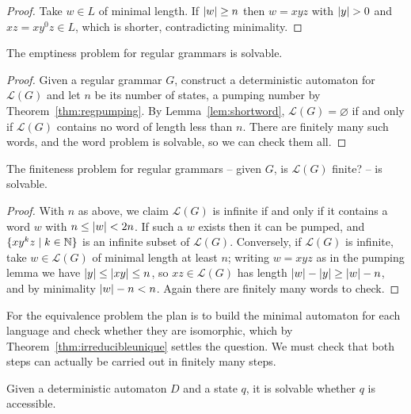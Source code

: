 \documentclass[a4paper]{scrartcl}
\newcommand{\lang}{\mathcal{L}}
\begin{document}
\begin{proof}
	Take $w \in L$ of minimal length. If $\lvert w\rvert \geq n$ then $w = xyz$ with $\lvert y\rvert > 0$ and $xz = xy^0z \in L$, which is shorter, contradicting minimality.
\end{proof}

\begin{corollary}\label{cor:regemptiness}
	The emptiness problem for regular grammars is solvable.
\end{corollary}

\begin{proof}
	Given a regular grammar $G$, construct a deterministic automaton for $\lang(G)$ and let $n$ be its number of states, a pumping number by Theorem~\ref{thm:regpumping}. By Lemma~\ref{lem:shortword}, $\lang(G) = \varnothing$ if and only if $\lang(G)$ contains no word of length less than $n$. There are finitely many such words, and the word problem is solvable, so we can check them all.
\end{proof}

\begin{corollary}
	The finiteness problem for regular grammars -- given $G$, is $\lang(G)$ finite? -- is solvable.
\end{corollary}

\begin{proof}
	With $n$ as above, we claim $\lang(G)$ is infinite if and only if it contains a word $w$ with $n \leq \lvert w\rvert < 2n$. If such a $w$ exists then it can be pumped, and $\{xy^kz \mid k \in \mathbb{N}\}$ is an infinite subset of $\lang(G)$. Conversely, if $\lang(G)$ is infinite, take $w \in \lang(G)$ of minimal length at least $n$; writing $w = xyz$ as in the pumping lemma we have $\lvert y\rvert \leq \lvert xy\rvert \leq n$, so $xz \in \lang(G)$ has length $\lvert w\rvert - \lvert y\rvert \geq \lvert w\rvert - n$, and by minimality $\lvert w\rvert - n < n$. Again there are finitely many words to check.
\end{proof}

For the equivalence problem the plan is to build the minimal automaton for each language and check whether they are isomorphic, which by Theorem~\ref{thm:irreducibleunique} settles the question. We must check that both steps can actually be carried out in finitely many steps.

\begin{proposition}
	Given a deterministic automaton $D$ and a state $q$, it is solvable whether $q$ is accessible.
\end{proposition}
\end{document}
